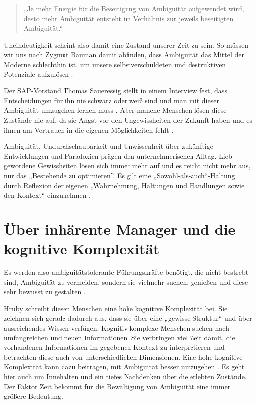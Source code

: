 \documentclass[
  ngerman,
  letterpaper,
  DIV=11]{scrartcl}
\begin{document}
\begin{quote}
„Je mehr Energie für die Beseitigung von Ambiguität aufgewendet wird,
desto mehr Ambiguität entsteht im Verhältnis zur jeweils beseitigten
Ambiguität.`` \autocite[76]{bauer2018}
\end{quote}

Uneindeutigkeit scheint also damit eine Zustand unserer Zeit zu sein. So
müssen wir uns nach Zygmut Bauman \autocite*{bauman2016} damit abfinden,
dass Ambiguität das Mittel der Moderne schlechthin ist, um unsere
selbstverschuldeten und destruktiven Potenziale aufzulösen
\autocite{bauman2016}.

Der SAP-Vorstand Thomas Saueressig stellt in einem Interview fest, dass
Entscheidungen für ihn nie schwarz oder weiß sind und man mit dieser
Ambiguität umzugehen lernen muss \autocite{witte2024}. Aber manche
Menschen lösen diese Zustände nie auf, da sie Angst vor den
Ungewissheiten der Zukunft haben und es ihnen am Vertrauen in die
eigenen Möglichkeiten fehlt \autocite{morschitzky2009}.

Ambiguität, Undurchschaubarkeit und Unwissenheit über zukünftige
Entwicklungen und Paradoxien prägen den unternehmerischen Alltag. Lieb
gewordene Gewissheiten lösen sich immer mehr auf und es reicht nicht
mehr aus, nur das „Bestehende zu optimieren''. Es gilt eine
„Sowohl-als-auch``-Haltung durch Reflexion der eigenen „Wahrnehmung,
Haltungen und Handlungen sowie den Kontext`` einzunehmen
\autocite{kozica2025}.

\section{Über inhärente Manager und die kognitive
Komplexität}\label{uxfcber-inhuxe4rente-manager-und-die-kognitive-komplexituxe4t}

Es werden also ambiguitätstolerante Führungskräfte benötigt, die nicht
bestrebt sind, Ambiguität zu vermeiden, sondern sie vielmehr suchen,
genießen und diese sehr bewusst zu gestalten \autocite{bauer2018}.

Hruby schreibt diesen Menschen eine hohe kognitive Komplexität bei. Sie
zeichnen sich gerade dadurch aus, dass sie über eine „gewisse Struktur``
und über ausreichendes Wissen verfügen. Kognitiv komplexe Menschen
suchen nach umfangreichen und neuen Informationen. Sie verbringen viel
Zeit damit, die vorhandenen Informationen im gegebenen Kontext zu
interpretieren und betrachten diese auch von unterschiedlichen
Dimensionen. Eine hohe kognitive Komplexität kann dazu beitragen, mit
Ambiguität besser umzugehen \autocite{hruby2014}. Es geht hier auch um
Innehalten und ein tiefes Nachdenken über die erlebten Zustände. Der
Faktor Zeit bekommt für die Bewältigung von Ambiguität eine immer
größere Bedeutung.
\end{document}
